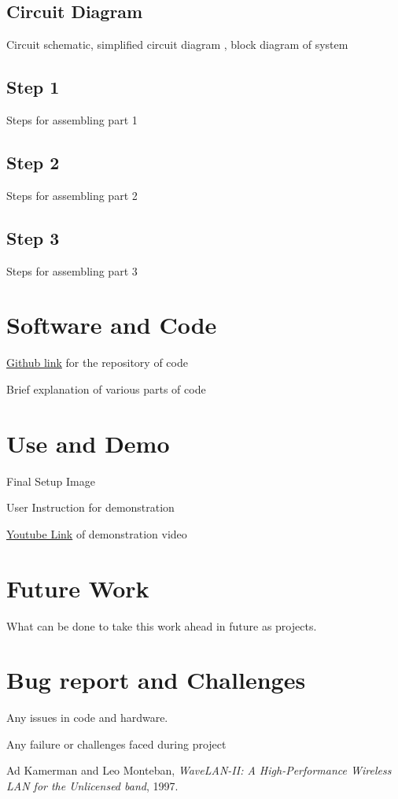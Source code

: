 \documentclass[a4paper,12pt,oneside]{book}
\begin{document}
\subsection*{Circuit Diagram}
Circuit schematic, simplified circuit diagram , block diagram of system
\subsection*{Step 1}
Steps for assembling part 1
\subsection*{Step 2}
Steps for assembling part 2
\subsection*{Step 3}
Steps for assembling part 3



\section{Software and Code}
\href{http://www.github.com}{Github link} for the repository of code

Brief explanation of various parts of code 

\section{Use and Demo}
Final Setup Image

User Instruction for demonstration

\href{http://www.youtube.com}{Youtube Link} of demonstration video 

\section{Future Work}
What can be done to take this work ahead in future as projects.

\section{Bug report and Challenges}
Any issues in code and hardware.

Any failure or challenges faced during project

\begin{thebibliography}{li}
Ad Kamerman and Leo Monteban,
{\em WaveLAN-II: A High-Performance Wireless LAN for the Unlicensed band},
1997.

\end{thebibliography}
\end{document}
